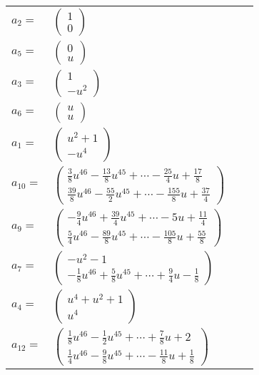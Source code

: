 \documentclass[1p]{elsarticle_modified}
\theoremstyle{definition}
\begin{document}
\begin{tabular}{m{7pt} m{180pt} m{7pt} m{180pt} }
\flushright $a_{2}=$&$\begin{pmatrix}1\\0\end{pmatrix}$ \\
\flushright $a_{5}=$&$\begin{pmatrix}0\\u\end{pmatrix}$ \\
\flushright $a_{3}=$&$\begin{pmatrix}1\\- u^2\end{pmatrix}$ \\
\flushright $a_{6}=$&$\begin{pmatrix}u\\u\end{pmatrix}$ \\
\flushright $a_{1}=$&$\begin{pmatrix}u^2+1\\- u^4\end{pmatrix}$ \\
\flushright $a_{10}=$&$\begin{pmatrix}\frac{3}{8} u^{46}-\frac{13}{8} u^{45}+\cdots-\frac{25}{4} u+\frac{17}{8}\\\frac{39}{8} u^{46}-\frac{55}{2} u^{45}+\cdots-\frac{155}{8} u+\frac{37}{4}\end{pmatrix}$ \\
\flushright $a_{9}=$&$\begin{pmatrix}-\frac{9}{4} u^{46}+\frac{39}{4} u^{45}+\cdots-5 u+\frac{11}{4}\\\frac{5}{4} u^{46}-\frac{89}{8} u^{45}+\cdots-\frac{105}{8} u+\frac{55}{8}\end{pmatrix}$ \\
\flushright $a_{7}=$&$\begin{pmatrix}- u^2-1\\-\frac{1}{8} u^{46}+\frac{5}{8} u^{45}+\cdots+\frac{9}{4} u-\frac{1}{8}\end{pmatrix}$ \\
\flushright $a_{4}=$&$\begin{pmatrix}u^4+u^2+1\\u^4\end{pmatrix}$ \\
\flushright $a_{12}=$&$\begin{pmatrix}\frac{1}{8} u^{46}-\frac{1}{2} u^{45}+\cdots+\frac{7}{8} u+2\\\frac{1}{4} u^{46}-\frac{9}{8} u^{45}+\cdots-\frac{11}{8} u+\frac{1}{8}\end{pmatrix}$ \\

\end{tabular}
\end{document}
